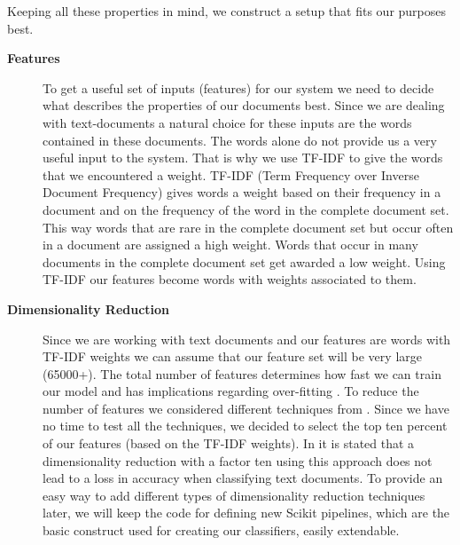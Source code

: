 Keeping all these properties in mind, we construct a setup that fits our purposes best.


\begin{description}
\item[\textbf{Features}] 
To get a useful set of inputs (features) for our system we need to decide what describes the properties of our documents best. Since we are dealing with text-documents a natural choice for these inputs are the words contained in these documents. 
The words alone do not provide us a very useful input to the system. That is why we use TF-IDF to give the words that we encountered a weight. TF-IDF (Term Frequency over Inverse Document Frequency) gives words a weight based on their frequency in a document and on the frequency of the word in the complete document set. This way words that are rare in the complete document set but occur often in a document are assigned a high weight. Words that occur in many documents in the complete document set get awarded a low weight\cite{ramos_tfidf}.
Using TF-IDF our features become words with weights associated to them.

\item[\textbf{Dimensionality Reduction}]
Since we are working with text documents and our features are words with TF-IDF weights we can assume that our feature set will be very large (65000+). The total number of features determines how fast we can train our model and has implications regarding over-fitting \cite{ml_text}. To reduce the number of features we considered different techniques from \cite{ml_text}. Since we have no time to test all the techniques, we decided to select the top ten percent of our features (based on the TF-IDF weights). In \cite{yang1997} it is stated that a dimensionality reduction with a factor ten using this approach does not lead to a loss in accuracy when classifying text documents. To provide an easy way to add different types of dimensionality reduction techniques later, we will keep the code for defining new Scikit pipelines, which are the basic construct used for creating our classifiers, easily extendable.


\end{description}
